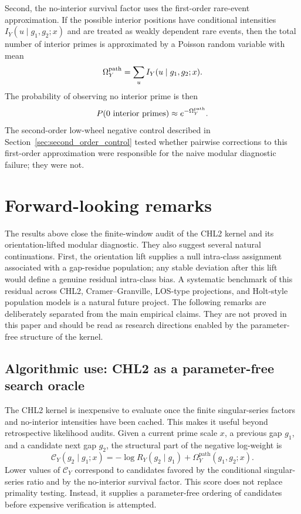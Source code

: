\documentclass[10pt]{article}
\newcommand{\Omegapath}{\Omega_Y^{\mathrm{path}}}
\begin{document}
Second, the no-interior survival factor uses the first-order rare-event approximation.  If the possible interior positions have conditional intensities $I_Y(u\mid g_1,g_2;x)$ and are treated as weakly dependent rare events, then the total number of interior primes is approximated by a Poisson random variable with mean
\[
\Omega_Y^{\rm path}=\sum_u I_Y(u\mid g_1,g_2;x).
\]
The probability of observing no interior prime is then
\[
P(0\ \text{interior primes})\approx e^{-\Omega_Y^{\rm path}}.
\]
The second-order low-wheel negative control described in Section~\ref{sec:second_order_control} tested whether pairwise corrections to this first-order approximation were responsible for the naive modular diagnostic failure; they were not.

\section{Forward-looking remarks}
The results above close the finite-window audit of the CHL2 kernel and its orientation-lifted modular diagnostic.  They also suggest several natural continuations.  First, the orientation lift supplies a null intra-class assignment associated with a gap-residue population; any stable deviation after this lift would define a genuine residual intra-class bias.  A systematic benchmark of this residual across CHL2, Cramer--Granville, LOS-type projections, and Holt-style population models is a natural future project.  The following remarks are deliberately separated from the main empirical claims.  They are not proved in this paper and should be read as research directions enabled by the parameter-free structure of the kernel.

\subsection{Algorithmic use: CHL2 as a parameter-free search oracle}
The CHL2 kernel is inexpensive to evaluate once the finite singular-series factors and no-interior intensities have been cached.  This makes it useful beyond retrospective likelihood audits.  Given a current prime scale $x$, a previous gap $g_1$, and a candidate next gap $g_2$, the structural part of the negative log-weight is
\[
\mathcal C_Y(g_2\mid g_1;x)
=
-\log R_Y(g_2\mid g_1)+\Omegapath(g_1,g_2;x).
\]
Lower values of $\mathcal C_Y$ correspond to candidates favored by the conditional singular-series ratio and by the no-interior survival factor.  This score does not replace primality testing.  Instead, it supplies a parameter-free ordering of candidates before expensive verification is attempted.
\end{document}
